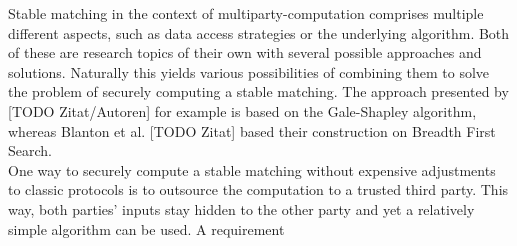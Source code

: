 Stable matching in the context of multiparty-computation comprises multiple different aspects, such as data access strategies or the underlying algorithm. Both of these are research topics of their own with several possible approaches and solutions. Naturally this yields various possibilities of combining them to solve the problem of securely computing a stable matching. The approach presented by [TODO Zitat/Autoren] for example is based on the Gale-Shapley algorithm, whereas Blanton et al. [TODO Zitat] based their construction on Breadth First Search.\\
One way to securely compute a stable matching without expensive adjustments to classic protocols is to outsource the computation to a trusted third party. This way, both parties' inputs stay hidden to the other party and yet a relatively simple algorithm can be used. A requirement 
